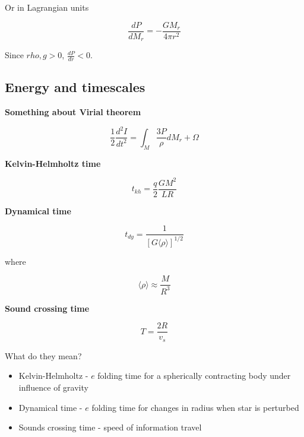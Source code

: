 \documentclass{article}
\begin{document}
Or in Lagrangian units

\begin{equation}
    \boxed{\frac{dP}{dM_r} = -\frac{GM_r}{4\pi r^2}}
\end{equation}

Since $rho, g > 0$, $\frac{dP}{dr} < 0$.

\subsection{Energy and timescales}

\textbf{Something about Virial theorem}

\begin{equation}
    \boxed{\frac{1}{2}\frac{d^2I}{dt^2} = \int_M \frac{3P}{\rho}dM_r + \Omega}
\end{equation}

\textbf{Kelvin-Helmholtz time}

\begin{equation}
    \boxed{t_{kh} = \frac{q}{2}\frac{GM^2}{LR}}
\end{equation}

\textbf{Dynamical time}

\begin{equation}
    \boxed{t_{dy} = \frac{1}{[G\langle \rho\rangle]^{1/2}}}
\end{equation}

where 

\begin{equation}
    \langle \rho\rangle \approx \frac{M}{R^3}
\end{equation}

\textbf{Sound crossing time}

\begin{equation}
    \boxed{T = \frac{2R}{v_s}}
\end{equation}

What do they mean?\\

\begin{itemize}
    \item Kelvin-Helmholtz - $e$ folding time for a spherically contracting body under influence of gravity

    \item Dynamical time - $e$ folding time for changes in radius when star is perturbed

    \item Sounds crossing time - speed of information travel
\end{itemize}
\end{document}
